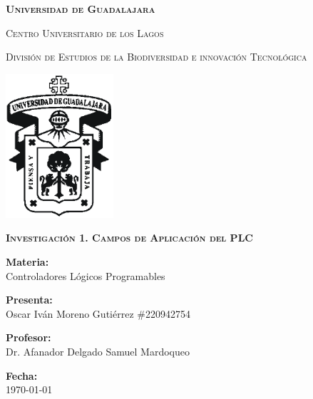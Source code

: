 \documentclass[12pt]{report}
\begin{document}
\setlength{\hoffset}{27 pt} %
\begin{titlepage}
{\centering
{\scshape\bfseries\fontsize{29.16}{34.992}\selectfont Universidad de Guadalajara \par}
\vspace{0.5cm}
{\scshape\Large Centro Universitario de los Lagos \par}
\vspace{1cm}
{\scshape\Large División de Estudios de la Biodiversidad e innovación Tecnológica \par}
\vspace{1cm}
{\graphicspath{{imagenes/Portada}} %
\includegraphics[width=0.3\textwidth]{image.png}\par}
\vspace{1cm}
{\scshape\large\bfseries Investigación 1. Campos de Aplicación del PLC \par}
\vspace{1.5cm}
{\large \textbf{Materia:} \\Controladores Lógicos Programables\par}
\vfill
{\large \textbf{Presenta:} \\Oscar Iván Moreno Gutiérrez \#220942754\par}
\vfill
{\large \textbf{Profesor:} \\Dr. Afanador Delgado Samuel Mardoqueo \par}
\vfill
\vfill
\begin{flushright}
  {\normalsize \textbf {Fecha:} \\ \today}
\end{flushright}
\vfill}
{\large  \par}
\end{titlepage}

\tableofcontents
\newpage
\end{document}
